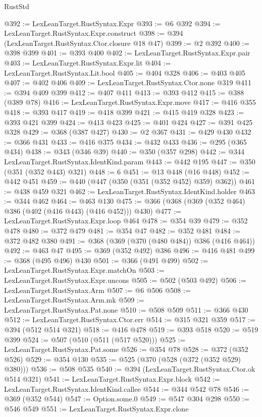 \begin{lexlean}{RustStd}
\begin{coremodule}
{\begin{coremodule}
{{{{{{{{{{@392 := LexLeanTarget.RustSyntax.Expr
@393 := @6 @392
@394 := LexLeanTarget.RustSyntax.Expr.construct
@398 := @394 (LexLeanTarget.RustSyntax.Ctor.closure @18 @47)
@399 := @2 @392
@400 := @398 @399
@401 := @393 @400
@402 := LexLeanTarget.RustSyntax.Expr.pair
@403 := LexLeanTarget.RustSyntax.Expr.lit
@404 := LexLeanTarget.RustSyntax.Lit.bool
@405 := @404 @328
@406 := @403 @405
@407 := @402 @406
@409 := LexLeanTarget.RustSyntax.Ctor.none @319
@411 := @394 @409 @399
@412 := @407 @411
@413 := @393 @412
@415 := @388 (@389 @78)
@416 := LexLeanTarget.RustSyntax.Expr.move
@417 := @416 @355
@418 := @393 @417
@419 := @418 @399
@421 := @415 @419 @328
@423 := @393 @421 @399
@424 := @413 @423
@425 := @401 @424
@427 := @391 @425 @328
@429 := @368 (@387 @427)
@430 := @2 @367
@431 := @429 @430
@432 := @366 @431
@433 := @416 @375
@434 := @432 @433
@436 := @295 (@365 @434)
@438 := @343 (@346 @39)
@440 := @350 (@357 @298)
@442 := @344 LexLeanTarget.RustSyntax.IdentKind.param
@443 := @442 @195
@447 := @350 (@351 (@352 @443) @321)
@448 := 6
@451 := @13 @448 (@16 @448)
@452 := @442 @451
@459 := @440 (@447 (@350 (@351 (@352 @452) @359) @362))
@461 := @438 @459 @321
@462 := LexLeanTarget.RustSyntax.IdentKind.holder
@463 := @344 @462
@464 := @463 @130
@475 := @366 (@368 (@369 (@352 @464) @386 (@402 (@416 @443) (@416 @452))) @430)
@477 := LexLeanTarget.RustSyntax.Expr.loop @464
@478 := @354 @39
@479 := @352 @478
@480 := @372 @479
@481 := @354 @47
@482 := @352 @481
@484 := @372 @482 @380
@491 := @368 (@369 (@370 (@480 @484)) @386 (@416 @464))
@492 := @463 @47
@495 := @369 (@352 @492) @386
@496 := @416 @481
@499 := @368 (@495 @496) @430
@501 := @366 (@491 @499)
@502 := LexLeanTarget.RustSyntax.Expr.matchOn
@503 := LexLeanTarget.RustSyntax.Expr.uncons
@505 := @502 (@503 @492)
@506 := LexLeanTarget.RustSyntax.Arm
@507 := @6 @506
@508 := LexLeanTarget.RustSyntax.Arm.mk
@509 := LexLeanTarget.RustSyntax.Pat.none
@510 := @508 @509
@511 := @366 @430
@512 := LexLeanTarget.RustSyntax.Ctor.err
@514 := @315 @321 @359
@517 := @394 (@512 @514 @321)
@518 := @416 @478
@519 := @393 @518
@520 := @519 @399
@524 := @507 (@510 (@511 (@517 @520)))
@525 := LexLeanTarget.RustSyntax.Pat.some
@526 := @354 @78
@528 := @372 (@352 @526)
@529 := @354 @130
@535 := @525 (@370 (@528 (@372 (@352 @529) @380)))
@536 := @508 @535
@540 := @394 (LexLeanTarget.RustSyntax.Ctor.ok @514 @321)
@541 := LexLeanTarget.RustSyntax.Expr.block
@542 := LexLeanTarget.RustSyntax.IdentKind.callee
@544 := @344 @542 @78
@546 := @369 (@352 @544)
@547 := Option.some.{0}
@549 := @547 @304 @298
@550 := @546 @549
@551 := LexLeanTarget.RustSyntax.Expr.clone
}}}}}}}}}}
\end{coremodule}}
\end{coremodule}
\end{lexlean}
